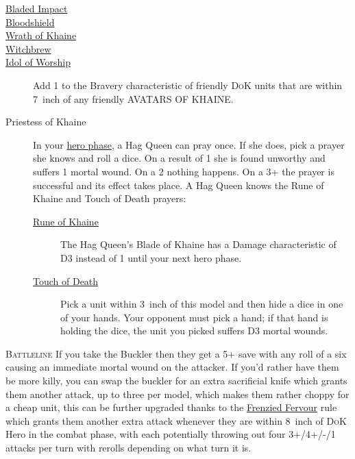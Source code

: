 \begin{description}
    \item [{\hyperref[bladed-impact]{Bladed Impact}}] 
    \item [{\hyperref[bloodshield]{Bloodshield}}]
    \item [{\hyperref[wrath-of-khaine]{Wrath of Khaine}}] 
    \item [{\hyperref[witchbrew]{Witchbrew}}]
    \item [{\hyperref[idol-of-worship]{Idol of Worship}}] Add 1 to the Bravery
        characteristic of friendly \textsc{DoK} units that are within 7~inch
        of any friendly AVATARS OF KHAINE.
    \item [Priestess of Khaine] In your \hyperref[hero-phase]{hero phase},
        a Hag Queen can pray once. If she does, pick a prayer she knows and
        roll a dice. On a result of 1 she is found unworthy and suffers
        1 mortal wound. On a 2 nothing happens. On a 3+ the prayer is
        successful and its effect takes place.  A Hag Queen knows the Rune of
        Khaine and Touch of Death prayers:
        \begin{description}
            \item [{\hyperref[rune-of-khaine]{Rune of Khaine}}] The Hag Queen's
                Blade of Khaine has a Damage characteristic of D3 instead of
                1 until your next hero phase.
            \item [{\hyperref[touch-of-death]{Touch of Death}}] Pick a unit within
                3~inch of this model and then hide a dice in one of your hands.
                Your opponent must pick a hand; if that hand is holding the
                dice, the unit you picked suffers D3 mortal wounds.
        \end{description}
\end{description}


\newpage %

\textsc{Battleline} If you take the Buckler
then they get a 5+ save with any roll of a six causing an immediate mortal
wound on the attacker. If you'd rather have them be more killy, you can swap
the buckler for an extra sacrificial knife which grants them another attack, up
to three per model, which makes them rather choppy for a cheap unit, this can
be further upgraded thanks to the
\hyperref[frenzied-fervour]{Frenzied Fervour} rule which grants them another
extra attack whenever they are within 8~inch of \textsc{DoK} Hero in the combat phase,
with each potentially throwing out four 3+/4+/-/1 attacks per turn with
rerolls depending on what turn it is.

